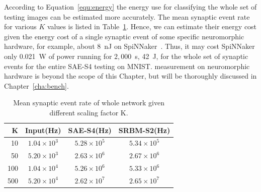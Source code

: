 According to Equation~\ref{equ:energy} the energy use for classifying the whole set of testing images can be estimated more accurately.
The mean synaptic event rate for various $K$ values is listed in Table~\ref{tbl:fire_rate}.
Hence, we can estimate their energy cost given the energy cost of a single synaptic event of some specific neuromorphic hardware, for example, about 8~nJ on SpiNNaker~\citep{stromatias2013power}.
Thus, it may cost SpiNNaker only 0.021~W of power running for $2,000$~s, 42~J, for the whole set of synaptic events for the entire SAE-S4 testing on MNIST.
\DIFdelbegin {}\DIFdelend \DIFaddbegin {}\DIFaddend measurement on neuromorphic hardware is beyond the scope of this Chapter, but will be thoroughly discussed in Chapter~\ref{cha:bench}.
\begin{table}[htbp]
	\centering
	\caption{\label{tbl:fire_rate}Mean synaptic event rate of whole network given different scaling factor K.}
	\bgroup
	\def\arraystretch{1.4}
	\begin{tabular}{r c c c}
		K & Input(Hz) & SAE-S4(Hz) & SRBM-S2(Hz)\\
		\hline
		10 & $1.04 \times 10^3$ & $5.28 \times 10^5$ & $5.34 \times 10^5$ \\
		50 & $5.20 \times 10^3$ & $2.63 \times 10^6$ & $2.67 \times 10^6$ \\
		100 & $1.04 \times 10^4$ & $5.26 \times 10^6$ & $5.33 \times 10^6$ \\
		500 & $5.20 \times 10^4$ & $2.62 \times 10^7$ & $2.65 \times 10^7$ \\
	\end{tabular}
	\egroup
\end{table}

\DIFaddbegin \paragraph{\\}

